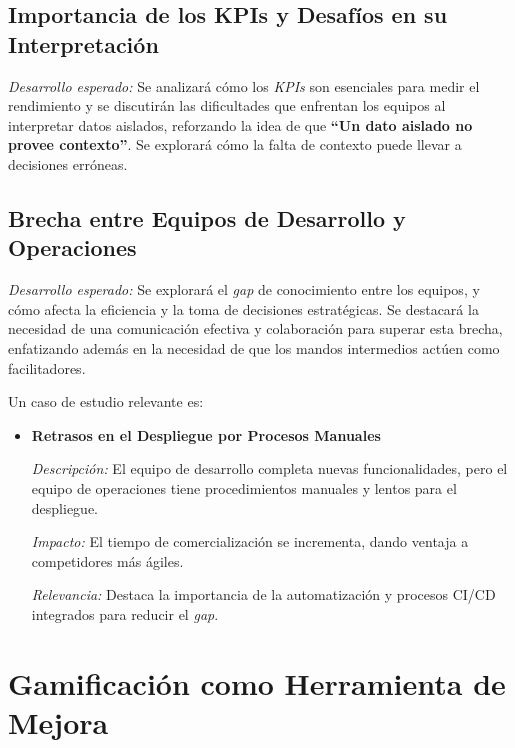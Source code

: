 \documentclass[journal]{IEEEtran}
\begin{document}
\subsection{\textbf{Importancia de los KPIs y Desafíos en su Interpretación}}

\textit{Desarrollo esperado:} Se analizará cómo los \textit{KPIs} son esenciales para medir el rendimiento y se discutirán las dificultades que enfrentan los equipos al interpretar datos aislados, reforzando la idea de que \textbf{``Un dato aislado no provee contexto''}. Se explorará cómo la falta de contexto puede llevar a decisiones erróneas.

\subsection{\textbf{Brecha entre Equipos de Desarrollo y Operaciones}}

\textit{Desarrollo esperado:} Se explorará el \textit{gap} de conocimiento entre los equipos, y cómo afecta la eficiencia y la toma de decisiones estratégicas. Se destacará la necesidad de una comunicación efectiva y colaboración para superar esta brecha, enfatizando además en la necesidad de que los mandos intermedios actúen como facilitadores.

Un caso de estudio relevante es:

\begin{itemize}
    \item \textbf{Retrasos en el Despliegue por Procesos Manuales}
    
    \textit{Descripción:} El equipo de desarrollo completa nuevas funcionalidades, pero el equipo de operaciones tiene procedimientos manuales y lentos para el despliegue.
    
    \textit{Impacto:} El tiempo de comercialización se incrementa, dando ventaja a competidores más ágiles.
    
    \textit{Relevancia:} Destaca la importancia de la automatización y procesos CI/CD integrados para reducir el \textit{gap}.
\end{itemize}

\section{\textbf{\Large Gamificación como Herramienta de Mejora}}
\end{document}
